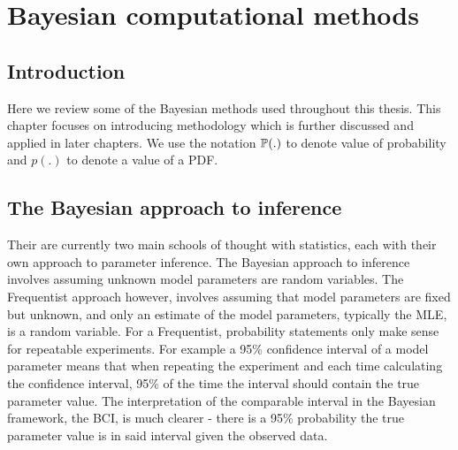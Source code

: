 
\singlespacing

\chapter{Bayesian computational methods}
\label{ch:Bayesian_computational_methods}

\onehalfspacing

\section{Introduction}

Here we review some of the Bayesian methods used throughout this thesis. This chapter focuses on introducing methodology
which is further discussed and applied in later chapters. We use the notation \(\mathbb{P}(.)\) to denote value of
probability and \(p(.)\) to denote a value of a \gls{PDF}.

\section{The Bayesian approach to inference} 
\label{sec:The_Bayesian_approach_to_inference}

Their are currently two main schools of thought with statistics, each with their own approach to parameter inference.
The Bayesian approach to inference involves assuming unknown model parameters are random variables. The Frequentist
approach however, involves assuming that model parameters are fixed but unknown, and only an estimate of the model
parameters, typically the \gls{MLE}, is a random variable. For a Frequentist, probability statements only make sense for
repeatable experiments. For example a 95\% confidence interval of a model parameter means that when repeating the
experiment and each time calculating the confidence interval, 95\% of the time the interval should contain the true
parameter value. The interpretation of the comparable interval in the Bayesian framework, the \gls{BCI}, is much clearer
- there is a 95\% probability the true parameter value is in said interval given the observed data.

